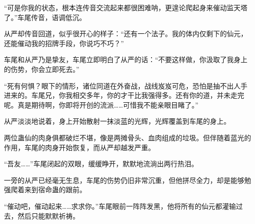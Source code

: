 \begin{this_body}
“可是你我的状态，根本连传音交流起来都很困难呐，更遑论爬起身来催动监天塔了。”车尾传音，语调低沉。

从严却传音回道，似乎很开心的样子：“还有一个法子。我的体内仅剩下的仙元，还能催动我的招牌手段，你说巧不巧？”

车尾和从严乃是挚友，车尾立即明白了从严的话：“不要这样做，你汲取了我身上的伤势，你会立即死去。”

“死有何惧？眼下的情形，诸位同道在外奋战，战线岌岌可危，恐怕是抽不出人手进来的。车尾兄，你我相交多年，你的才干比我强得多。还有你的道，并未走完呢。真是期待啊，你即将开创的流派……可惜我不能亲眼目睹了。”

从严淡淡地说着，身上开始散射一抹淡蓝的光辉，光辉覆盖到车尾的身上。

两位蛊仙的肉身俱都破烂不堪，像是两摊骨头、血肉组成的垃圾。但伴随着蓝光的作用，车尾的肉身开始恢复，而从严却越发严重。

“吾友……”车尾闭起的双眼，缓缓睁开，默默地流淌出两行热泪。

一旁的从严已经毫无生息，车尾的伤势仍旧非常沉重，但他拼尽全力，却是能够勉强爬着来到宿命蛊的跟前。

“催动吧，催动起来……求求你。”车尾眼前一阵阵发黑，他将所有的仙元都灌输过去，然后只能默默祈祷。

\end{this_body}

